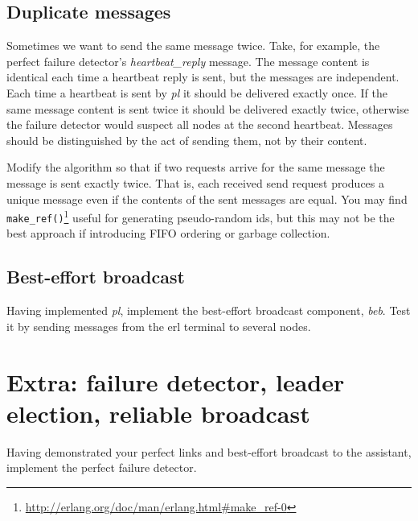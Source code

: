 \documentclass[a4paper]{article}
\begin{document}
\subsection{Duplicate messages} %
\label{ssub:duplicate_messages}

Sometimes we want to send the same message twice. Take, for example, the
perfect failure detector's \emph{heartbeat\_reply} message. The message
content is identical each time a heartbeat reply is sent, but the messages are
independent. Each time a heartbeat is sent by \emph{pl} it should be delivered
exactly once. If the same message content is sent twice it should be
delivered exactly twice, otherwise the failure detector would suspect all nodes at
the second heartbeat. Messages should be distinguished by the act of sending
them, not by their content.

Modify the algorithm so that if two requests arrive for the same message
the message is sent exactly twice. That is, each received send request
produces a unique message even if the contents of the sent messages are equal.
You may find
\verb!make_ref()!\footnote{\url{http://erlang.org/doc/man/erlang.html\#make_ref-0}}
useful for generating pseudo-random ids, but this may not be the best approach
if introducing FIFO ordering or garbage collection.



\subsection{Best-effort broadcast} %
\label{sub:best_effort_broadcast}

Having implemented \emph{pl}, implement the best-effort broadcast component,
\emph{beb}. Test it by sending messages from the erl terminal to several
nodes.






\section{Extra: failure detector, leader election, reliable broadcast} %
\label{sub:further_work}

Having demonstrated your perfect links and best-effort broadcast to the
assistant, implement the perfect failure detector.
\end{document}
